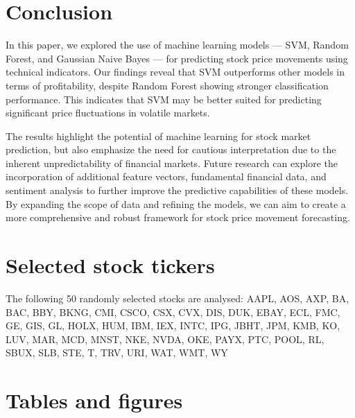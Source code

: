 \documentclass[aodsor,preprint]{imsart}
\numberwithin{equation}{section}
\theoremstyle{plain}
\begin{document}
\section{Conclusion}

In this paper, we explored the use of machine learning models — SVM, Random Forest, and Gaussian Naive Bayes — for predicting stock price movements using technical indicators. Our findings reveal that SVM outperforms other models in terms of profitability, despite Random Forest showing stronger classification performance. This indicates that SVM may be better suited for predicting significant price fluctuations in volatile markets.

The results highlight the potential of machine learning for stock market prediction, but also emphasize the need for cautious interpretation due to the inherent unpredictability of financial markets. Future research can explore the incorporation of additional feature vectors, fundamental financial data, and sentiment analysis to further improve the predictive capabilities of these models. By expanding the scope of data and refining the models, we can aim to create a more comprehensive and robust framework for stock price movement forecasting.



\newpage


{}

\newpage


\appendix

\section{Selected stock tickers}
\label{sec:appa}

The following 50 randomly selected stocks are analysed: AAPL, AOS, AXP, BA, BAC, BBY, BKNG, CMI, CSCO, CSX, CVX, DIS, DUK, EBAY, ECL, FMC, GE, GIS, GL, HOLX, HUM, IBM, IEX, INTC, IPG, JBHT, JPM, KMB, KO, LUV, MAR, MCD, MNST, NKE, NVDA, OKE, PAYX, PTC, POOL, RL, SBUX, SLB, STE, T, TRV, URI, WAT, WMT, WY



\section{Tables and figures}
\label{sec:appb}

\FloatBarrier


\end{document}
